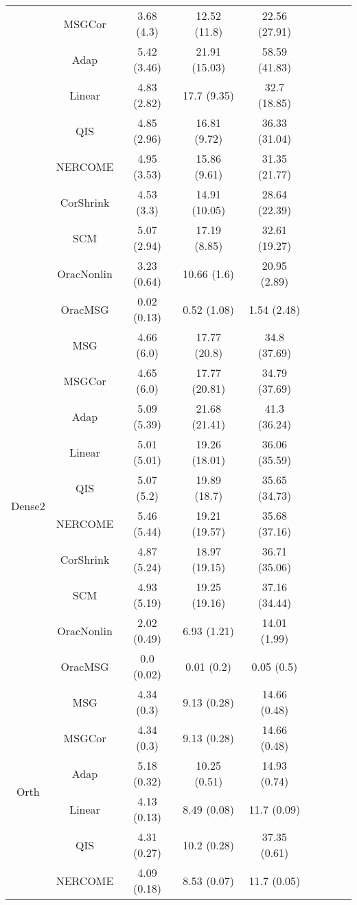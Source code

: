 \documentclass[useAMS,referee,usenatbib]{biom}
\begin{document}
\begin{table}[H]
{\begin{tabular}{ccccccccc}
 & MSGCor   & 3.68 (4.3)  & 12.52 (11.8)  & 22.56 (27.91) \\
 & Adap     & 5.42 (3.46) & 21.91 (15.03) & 58.59 (41.83) \\
 & Linear         & 4.83 (2.82) & 17.7 (9.35)   & 32.7 (18.85)  \\
 & QIS            & 4.85 (2.96) & 16.81 (9.72)  & 36.33 (31.04) \\
 & NERCOME        & 4.95 (3.53) & 15.86 (9.61)  & 31.35 (21.77) \\
 & CorShrink      & 4.53 (3.3)  & 14.91 (10.05) & 28.64 (22.39) \\
 & SCM            & 5.07 (2.94) & 17.19 (8.85)  & 32.61 (19.27) \\
 & OracNonlin & 3.23 (0.64) & 10.66 (1.6)   & 20.95 (2.89)  \\
 & OracMSG  & 0.02 (0.13) & 0.52 (1.08)   & 1.54 (2.48)  \\ \midrule
\multirow{10}{*}{Dense2}  
 & MSG & 4.66 (6.0)  & 17.77 (20.8)  & 34.8 (37.69)  \\
 & MSGCor   & 4.65 (6.0)  & 17.77 (20.81) & 34.79 (37.69) \\
 & Adap     & 5.09 (5.39) & 21.68 (21.41) & 41.3 (36.24)  \\
 & Linear         & 5.01 (5.01) & 19.26 (18.01) & 36.06 (35.59) \\
 & QIS            & 5.07 (5.2)  & 19.89 (18.7)  & 35.65 (34.73) \\
 & NERCOME        & 5.46 (5.44) & 19.21 (19.57) & 35.68 (37.16) \\
 & CorShrink      & 4.87 (5.24) & 18.97 (19.15) & 36.71 (35.06) \\
 & SCM            & 4.93 (5.19) & 19.25 (19.16) & 37.16 (34.44) \\
 & OracNonlin & 2.02 (0.49) & 6.93 (1.21)   & 14.01 (1.99)  \\
 & OracMSG  & 0.0 (0.02)  & 0.01 (0.2)    & 0.05 (0.5) \\ \midrule
\multirow{10}{*}{Orth}  
 & MSG & 4.34 (0.3)  & 9.13 (0.28)  & 14.66 (0.48) \\
 & MSGCor   & 4.34 (0.3)  & 9.13 (0.28)  & 14.66 (0.48) \\
 & Adap     & 5.18 (0.32) & 10.25 (0.51) & 14.93 (0.74) \\
 & Linear         & 4.13 (0.13) & 8.49 (0.08)  & 11.7 (0.09)  \\
 & QIS            & 4.31 (0.27) & 10.2 (0.28)  & 37.35 (0.61) \\
 & NERCOME        & 4.09 (0.18) & 8.53 (0.07)  & 11.7 (0.05)  \\

\end{tabular}}
\end{table}
\end{document}
